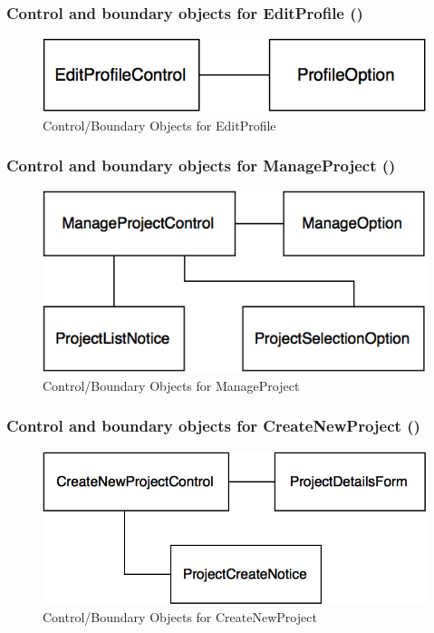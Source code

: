 \documentclass[12pt,letterpaper]{article}
\begin{document}
\subsubsection*{Control and boundary objects for EditProfile (\editprofile{})}

\begin{figure}[H]
	\centering{}
	\includegraphics[scale=0.4]{imgs/cbod/edit-profile.png}
	\caption{Control/Boundary Objects for EditProfile}
\end{figure}

\subsubsection*{Control and boundary objects for ManageProject (\manageproject{})}

\begin{figure}[H]
	\centering{}
	\includegraphics[scale=0.4]{imgs/cbod/manage-project.png}
	\caption{Control/Boundary Objects for ManageProject}
\end{figure}

\subsubsection*{Control and boundary objects for CreateNewProject (\createnewproject{})}

\begin{figure}[H]
	\centering{}
	\includegraphics[scale=0.4]{imgs/cbod/create-new-project.png}
	\caption{Control/Boundary Objects for CreateNewProject}
\end{figure}
\end{document}
